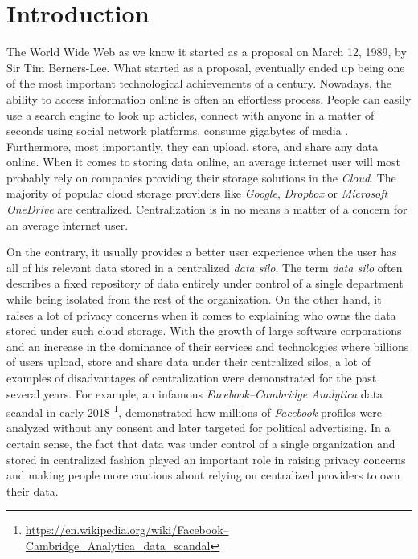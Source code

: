 \chapter*{Introduction}
\label{chap:introduction}

The World Wide Web as we know it started as a proposal on March 12, 1989, by Sir Tim Berners-Lee. What started as a proposal, eventually ended up being one of the most important technological achievements of a century. Nowadays, the ability to access information online is often an effortless process. People can easily use a search engine to look up articles, connect with anyone in a matter of seconds using social network platforms, consume gigabytes of media \cite{www_foundation_intro}. Furthermore, most importantly, they can upload, store, and share any data online. When it comes to storing data online, an average internet user will most probably rely on companies providing their storage solutions in the \textit{Cloud}. The majority of popular cloud storage providers like \textit{Google}, \textit{Dropbox} or \textit{Microsoft OneDrive} are centralized. Centralization is in no means a matter of a concern for an average internet user.

On the contrary, it usually provides a better user experience when the user has all of his relevant data stored in a centralized \textit{data silo}. The term \textit{data silo} often describes a fixed repository of data entirely under control of a single department while being isolated from the rest of the organization. On the other hand, it raises a lot of privacy concerns when it comes to explaining who owns the data stored under such cloud storage. With the growth of large software corporations and an increase in the dominance of their services and technologies where billions of users upload, store and share data under their centralized silos, a lot of examples of disadvantages of centralization were demonstrated for the past several years. For example, an infamous \textit{Facebook–Cambridge Analytica} data scandal in early 2018 \footnote{\url{https://en.wikipedia.org/wiki/Facebook–Cambridge_Analytica_data_scandal}}, demonstrated how millions of \textit{Facebook} profiles were analyzed without any consent and later targeted for political advertising. In a certain sense, the fact that data was under control of a single organization and stored in centralized fashion played an important role in raising privacy concerns and making people more cautious about relying on centralized providers to own their data.

